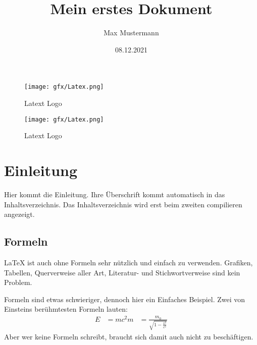 \documentclass[a4paper,10pt]{scrartcl}
\title{Mein erstes Dokument}
\author{Max Mustermann}
\date{08.12.2021}
\begin{document}
\maketitle

\begin{figure}[h]
\begin{center}
\texttt{[image: gfx/Latex.png]}
\caption{Latext Logo}
\label{latex_logo}
\end{center}
\end{figure}
\begin{figure}[h]
\begin{center}
\texttt{[image: gfx/Latex.png]}
\caption{Latext Logo}
\label{latex_logo}
\end{center}
\end{figure}

\tableofcontents


\section{Einleitung}
Hier kommt die Einleitung. Ihre Überschrift kommt automatisch in das Inhaltsverzeichnis. Das Inhaltsverzeichnis wird erst beim zweiten compilieren angezeigt.

\subsection{Formeln}
\LaTeX{} ist auch ohne Formeln sehr nützlich und einfach zu verwenden. Grafiken, Tabellen, Querverweise aller Art, Literatur- und Stichwortverweise sind kein Problem.

Formeln sind etwas schwieriger, dennoch hier ein Einfaches Beispiel. Zwei von Einsteins berühmtesten Formeln lauten:
\begin{align}
E &= mc^2
m &= \frac{m_0}{\sqrt{1-\frac{v^2}{c^2}}}
\end{align}
Aber wer keine Formeln schreibt, braucht sich damit auch nicht zu beschäftigen.
\end{document}
